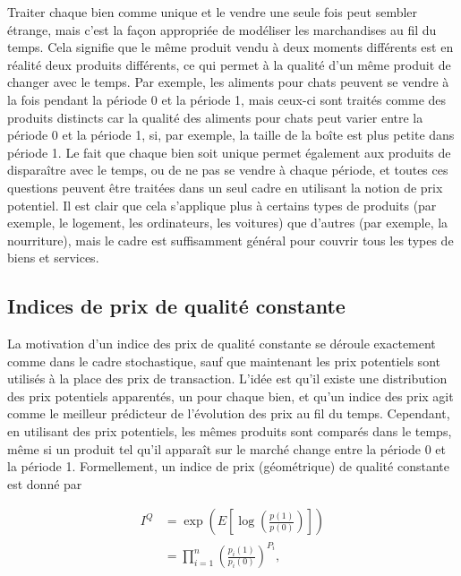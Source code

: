 \documentclass[
]{article}
\begin{document}
Traiter chaque bien comme unique et le vendre une seule fois peut sembler étrange, mais c'est la façon appropriée de modéliser les marchandises au fil du temps. Cela signifie que le même produit vendu à deux moments différents est en réalité deux produits différents, ce qui permet à la qualité d'un même produit de changer avec le temps. Par exemple, les aliments pour chats peuvent se vendre à la fois pendant la période 0 et la période 1, mais ceux-ci sont traités comme des produits distincts car la qualité des aliments pour chats peut varier entre la période 0 et la période 1, si, par exemple, la taille de la boîte est plus petite dans période 1. Le fait que chaque bien soit unique permet également aux produits de disparaître avec le temps, ou de ne pas se vendre à chaque période, et toutes ces questions peuvent être traitées dans un seul cadre en utilisant la notion de prix potentiel. Il est clair que cela s'applique plus à certains types de produits (par exemple, le logement, les ordinateurs, les voitures) que d'autres (par exemple, la nourriture), mais le cadre est suffisamment général pour couvrir tous les types de biens et services.

\hypertarget{indices-de-prix-de-qualituxe9-constante}{%
\subsection{Indices de prix de qualité constante}\label{indices-de-prix-de-qualituxe9-constante}}

La motivation d'un indice des prix de qualité constante se déroule exactement comme dans le cadre stochastique, sauf que maintenant les prix potentiels sont utilisés à la place des prix de transaction. L'idée est qu'il existe une distribution des prix potentiels apparentés, un pour chaque bien, et qu'un indice des prix agit comme le meilleur prédicteur de l'évolution des prix au fil du temps. Cependant, en utilisant des prix potentiels, les mêmes produits sont comparés dans le temps, même si un produit tel qu'il apparaît sur le marché change entre la période 0 et la période 1. Formellement, un indice de prix (géométrique) de qualité constante est donné par

\begin{align*}
I^{Q} &= \exp\left(E \left[\log \left(\frac{p(1)}{p(0)} \right) \right] \right) \\
&= \prod_{i = 1}^{n} \left(\frac{p_{i}(1)}{p_{i}(0)} \right)^{P_{i}},
\end{align*}
\end{document}
